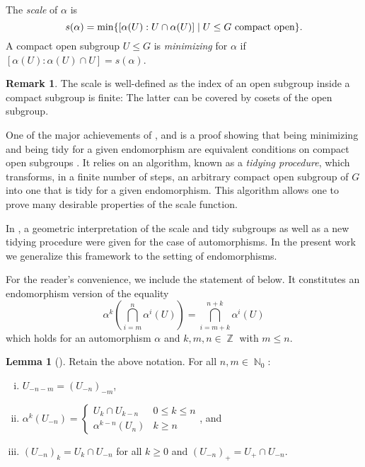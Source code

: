 \documentclass{article}
\DeclareMathOperator\bbN{\mathbb{N}}
\DeclareMathOperator\bbZ{\mathbb{Z}}
\theoremstyle{definition}
\newtheorem{lemma}[theorem]{Lemma}
\newtheorem{remark}[theorem]{Remark}
\begin{document}
The \emph{scale} of $\alpha$ is 
\[s(\alpha) = \min\{[\alpha(U):U\cap \alpha(U)]\mid U\le G \hbox{ compact open}\}.\]
A compact open subgroup $U\le G$ is \emph{minimizing} for $\alpha$ if $[\alpha(U):\alpha(U)\cap U]=s(\alpha)$.

\begin{remark}
The scale is well-defined as the index of an open subgroup inside a compact subgroup is finite: The latter can be covered by cosets of the open subgroup.
\end{remark}

One of the major achievements of \cite{Wil94},\cite{Wil01} and \cite{Wil15} is a proof showing that being minimizing and being tidy for a given endomorphism are equivalent conditions on compact open subgroups \cite[Theorem 2]{Wil15}. It relies on an algorithm, known as a \emph{tidying procedure}, which transforms, in a finite number of steps, an arbitrary compact open subgroup of $G$ into one that is tidy for a given endomorphism. This algorithm  allows one to prove many desirable properties of the scale function.

In \cite{Moe02}, a geometric interpretation of the scale and tidy subgroups as well as a new tidying procedure were given for the case of automorphisms. In the present work we generalize this framework to the setting of endomorphisms.

For the reader's convenience, we include the statement of \cite[Lemma 2]{Wil15} below. It constitutes an endomorphism version of the equality \begin{displaymath}
\alpha^{k}\left(\bigcap_{i=m}^{n}\alpha^{i}(U)\right)=\bigcap_{i=m+k}^{n+k}\alpha^{i}(U)
\end{displaymath}
which holds for an automorphism $\alpha$ and $k,m,n\in\bbZ$ with $m\le n$.

\begin{lemma}[{\cite[Lemma 2]{Wil15}}]\label{lem:wil_lem2}
Retain the above notation. For all $n,m\in\bbN_0$:
\begin{enumerate}[(i)]
  \item $U_{-n-m}=(U_{-n})_{-m}$,
  \item $\alpha^{k}(U_{-n})=\begin{cases} U_{k}\cap U_{k-n} & 0\le k\le n \\ \alpha^{k-n}(U_{n}) & k\ge n\end{cases}$, and
  \item\label{item:wil_lem2_iii} $(U_{-n})_{k}=U_{k}\cap U_{-n}$ for all $k\ge 0$ and $(U_{-n})_{+}=U_{+}\cap U_{-n}$.
\end{enumerate}
\end{lemma}
\end{document}
